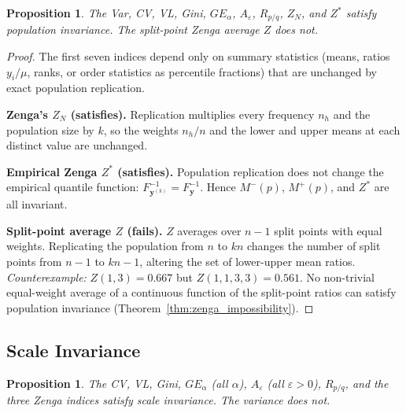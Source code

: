 \documentclass[12pt]{article}
\theoremstyle{plain}
\newtheorem{proposition}[theorem]{Proposition}
\theoremstyle{definition}
\theoremstyle{remark}
\newcommand{\bfy}{\mathbf{y}}
\begin{document}
\begin{proposition}\label{prop:pop}
The Var, CV, VL, Gini, $GE_\alpha$, $A_\varepsilon$, $R_{p/q}$, $Z_N$, and $Z^*$ satisfy population invariance.
The split-point Zenga average $Z$ does not.
\end{proposition}

\begin{proof}
The first seven indices depend only on summary statistics (means, ratios $y_i/\mu$, ranks, or order statistics as percentile fractions) that are unchanged by exact population replication.

\textbf{Zenga's $Z_N$ (satisfies).}
Replication multiplies every frequency $n_h$ and the population size by $k$, so the weights $n_h/n$ and the lower and upper means at each distinct value are unchanged.

\textbf{Empirical Zenga $Z^*$ (satisfies).}
Population replication does not change the empirical quantile function: $F^{-1}_{\bfy^{(k)}} = F^{-1}_{\bfy}$.
Hence $M^{-}(p)$, $M^{+}(p)$, and $Z^*$ are all invariant.

\textbf{Split-point average $Z$ (fails).}
$Z$ averages over $n - 1$ split points with equal weights.
Replicating the population from $n$ to $kn$ changes the number of split points from $n - 1$ to $kn - 1$, altering the set of lower-upper mean ratios.
\emph{Counterexample:} $Z(1, 3) = 0.667$ but $Z(1, 1, 3, 3) = 0.561$.
No non-trivial equal-weight average of a continuous function of the split-point ratios can satisfy population invariance (Theorem~\ref{thm:zenga_impossibility}).
\end{proof}

\subsection{Scale Invariance}

\begin{proposition}\label{prop:scale}
The CV, VL, Gini, $GE_\alpha$ (all $\alpha$), $A_\varepsilon$ (all $\varepsilon > 0$), $R_{p/q}$, and the three Zenga indices satisfy scale invariance.
The variance does not.
\end{proposition}
\end{document}

